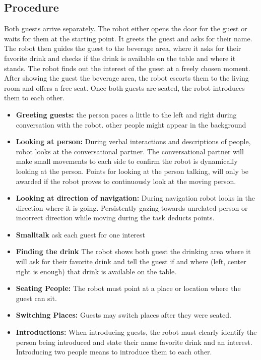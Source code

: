 \subsection*{Procedure}
Both guests arrive separately. The robot either opens the door for the guest or waits for them at the starting point. It greets the guest and asks for their name. The robot then guides the guest to the beverage area, where it asks for their favorite drink and checks if the drink is available on the table and where it stands. The robot finds out the interest of the guest at a freely chosen moment. After showing the guest the beverage area, the robot escorts them to the living room and offers a free seat. Once both guests are seated, the robot introduces them to each other.
\begin{itemize}
	\item \textbf{Greeting guests:} the person paces a little to the left and right during conversation with the robot. other people might appear in the background
	
	\item \textbf{Looking at person:} During verbal interactions and descriptions of people, robot 
	looks at the conversational partner. The conversational partner will make small movements to each side to confirm the robot is dynamically looking at the person. Points for looking at the person talking, will only be awarded if the robot proves to continuously look at the moving person. 
	
	\item \textbf{Looking at direction of navigation:} During navigation robot looks in the direction where it is going. Persistently gazing towards unrelated person or incorrect direction while moving during the task deducts points. 
    
    \item \textbf{Smalltalk} ask each guest for one interest 
    
    \item \textbf{Finding the drink} The robot shows both guest the drinking area where it will ask for their favorite drink and tell the guest if and where (left, center right is enough) that drink is available on the table. 
	
	\item \textbf{Seating People:} The robot must point at a place or location where the guest can sit.
	
	\item \textbf{Switching Places:} Guests may switch places after they were seated.
	
	\item \textbf{Introductions:} When introducing guests, the robot must clearly identify the person being introduced and state their name favorite drink and an interest. Introducing two people means to introduce them to each other. 
\end{itemize}

